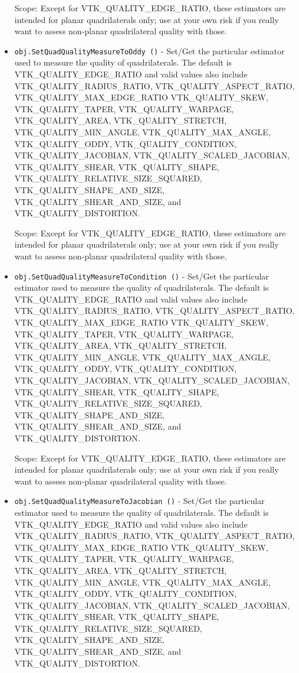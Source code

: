 \begin{itemize}
 Scope: Except for VTK\_QUALITY\_EDGE\_RATIO, these estimators are intended for planar
 quadrilaterals only; use at your own risk if you really want to assess non-planar
 quadrilateral quality with those.

\item  \verb|obj.SetQuadQualityMeasureToOddy ()| -  Set/Get the particular estimator used to measure the quality of quadrilaterals.
 The default is VTK\_QUALITY\_EDGE\_RATIO and valid values also include
 VTK\_QUALITY\_RADIUS\_RATIO, VTK\_QUALITY\_ASPECT\_RATIO, VTK\_QUALITY\_MAX\_EDGE\_RATIO
 VTK\_QUALITY\_SKEW, VTK\_QUALITY\_TAPER, VTK\_QUALITY\_WARPAGE, VTK\_QUALITY\_AREA,
 VTK\_QUALITY\_STRETCH, VTK\_QUALITY\_MIN\_ANGLE, VTK\_QUALITY\_MAX\_ANGLE,
 VTK\_QUALITY\_ODDY, VTK\_QUALITY\_CONDITION, VTK\_QUALITY\_JACOBIAN,
 VTK\_QUALITY\_SCALED\_JACOBIAN, VTK\_QUALITY\_SHEAR, VTK\_QUALITY\_SHAPE,
 VTK\_QUALITY\_RELATIVE\_SIZE\_SQUARED, VTK\_QUALITY\_SHAPE\_AND\_SIZE,
 VTK\_QUALITY\_SHEAR\_AND\_SIZE, and VTK\_QUALITY\_DISTORTION.

 Scope: Except for VTK\_QUALITY\_EDGE\_RATIO, these estimators are intended for planar
 quadrilaterals only; use at your own risk if you really want to assess non-planar
 quadrilateral quality with those.

\item  \verb|obj.SetQuadQualityMeasureToCondition ()| -  Set/Get the particular estimator used to measure the quality of quadrilaterals.
 The default is VTK\_QUALITY\_EDGE\_RATIO and valid values also include
 VTK\_QUALITY\_RADIUS\_RATIO, VTK\_QUALITY\_ASPECT\_RATIO, VTK\_QUALITY\_MAX\_EDGE\_RATIO
 VTK\_QUALITY\_SKEW, VTK\_QUALITY\_TAPER, VTK\_QUALITY\_WARPAGE, VTK\_QUALITY\_AREA,
 VTK\_QUALITY\_STRETCH, VTK\_QUALITY\_MIN\_ANGLE, VTK\_QUALITY\_MAX\_ANGLE,
 VTK\_QUALITY\_ODDY, VTK\_QUALITY\_CONDITION, VTK\_QUALITY\_JACOBIAN,
 VTK\_QUALITY\_SCALED\_JACOBIAN, VTK\_QUALITY\_SHEAR, VTK\_QUALITY\_SHAPE,
 VTK\_QUALITY\_RELATIVE\_SIZE\_SQUARED, VTK\_QUALITY\_SHAPE\_AND\_SIZE,
 VTK\_QUALITY\_SHEAR\_AND\_SIZE, and VTK\_QUALITY\_DISTORTION.

 Scope: Except for VTK\_QUALITY\_EDGE\_RATIO, these estimators are intended for planar
 quadrilaterals only; use at your own risk if you really want to assess non-planar
 quadrilateral quality with those.

\item  \verb|obj.SetQuadQualityMeasureToJacobian ()| -  Set/Get the particular estimator used to measure the quality of quadrilaterals.
 The default is VTK\_QUALITY\_EDGE\_RATIO and valid values also include
 VTK\_QUALITY\_RADIUS\_RATIO, VTK\_QUALITY\_ASPECT\_RATIO, VTK\_QUALITY\_MAX\_EDGE\_RATIO
 VTK\_QUALITY\_SKEW, VTK\_QUALITY\_TAPER, VTK\_QUALITY\_WARPAGE, VTK\_QUALITY\_AREA,
 VTK\_QUALITY\_STRETCH, VTK\_QUALITY\_MIN\_ANGLE, VTK\_QUALITY\_MAX\_ANGLE,
 VTK\_QUALITY\_ODDY, VTK\_QUALITY\_CONDITION, VTK\_QUALITY\_JACOBIAN,
 VTK\_QUALITY\_SCALED\_JACOBIAN, VTK\_QUALITY\_SHEAR, VTK\_QUALITY\_SHAPE,
 VTK\_QUALITY\_RELATIVE\_SIZE\_SQUARED, VTK\_QUALITY\_SHAPE\_AND\_SIZE,
 VTK\_QUALITY\_SHEAR\_AND\_SIZE, and VTK\_QUALITY\_DISTORTION.


\end{itemize}
